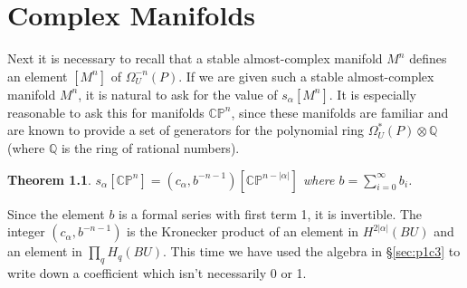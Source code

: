 \documentclass[../main]{subfiles}
\begin{document}
\label{sec:p1c8}

\newtheorem{thm}[equation]{Theorem}

\chapter{Complex Manifolds} %

Next it is necessary to recall that a stable almost-complex manifold $M^n$ defines an element $[M^n]$ of $\Omega^{-n}_U(P)$. If we are given such a stable almost-complex manifold $M^n$, it is natural to ask for the value of $s_\alpha [M^n]$. It is especially reasonable to ask this for manifolds $\mathbb{CP}^n$, since these manifolds are familiar and are known to provide a set of generators for the polynomial ring $\Omega_U^*(P) \otimes \mathbb{Q}$ (where $\mathbb{Q}$ is the ring of rational numbers).
\begin{thm}\label{thm:p1c08.1}
$s_\alpha[\mathbb{CP}^n] = (c_\alpha,b^{-n-1})[\mathbb{CP}^{n-|\alpha|}]$ where $b = \displaystyle \sum_{i=0}^\infty b_i$.
\end{thm}
\begin{explanation}
Since the element $b$ is a formal series with first term 1, it is invertible. The integer $(c_\alpha, b^{-n-1})$ is the Kronecker product of an element in $H^{2|\alpha|}(BU)$ and an element in $\prod_q H_q(BU)$. This time we have used the algebra in \S\ref{sec:p1c3} to write down a coefficient which isn't necessarily 0 or 1.
\end{explanation}
\end{document}
